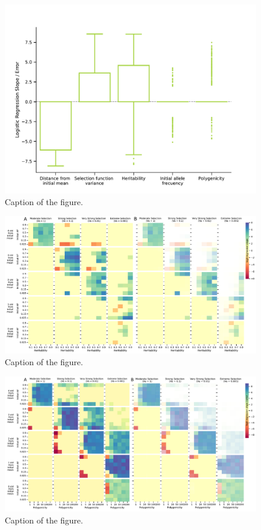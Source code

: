 \documentclass{article}
\begin{document}
\begin{figure}[b]
    \centering
    \includegraphics[width=1\textwidth]{figures/slopes_lr.pdf}
    \caption{Caption of the figure.}
    \label{fig:slopes_lr}
\end{figure}

\begin{figure}[b]
    \centering
    \includegraphics[width=1\textwidth]{figures/poly_panel_figure_2plots.pdf}
    \caption{Caption of the figure.}
    \label{fig:poly_panel_figure}
\end{figure}

\begin{figure}[b]
    \centering
    \includegraphics[width=1\textwidth]{figures/h2_panel_figure_2plots.pdf}
    \caption{Caption of the figure.}
    \label{fig:h2_panel_figure}
\end{figure}
\end{document}
